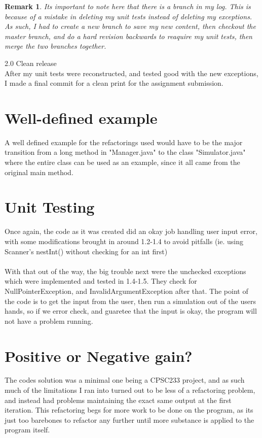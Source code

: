 \documentclass{article}
\newtheorem*{REM}{Remark}
\begin{document}
		\begin{REM}
			Its important to note here that there is a branch in my log. This is because of a mistake in deleting my unit tests
			instead of deleting my exceptions. As such, I had to create a new branch to save my new content, then checkout
			the master branch, and do a hard revision backwards to reaquire my unit tests, then merge the two branches together.
		\end{REM}
		\begin{description}
			\item 2.0 Clean release \hfill \\
				After my unit tests were reconstructed, and tested good with the new exceptions, I made a final commit for a 
				clean print for the assignment submission.
		\end{description}
	\section*{Well-defined example}
		A well defined example for the refactorings used would have to be the major transition from a long method in "Manager.java"
		to the class "Simulator.java" where the entire class can be used as an example, since it all came from the original main method.

	\section*{Unit Testing}
		Once again, the code as it was created did an okay job handling user input error, with some modifications 
		brought in around 1.2-1.4 to avoid pitfalls (ie. using Scanner's nestInt() without checking for an int first) \\ \\
		With that out of the way, the big trouble next were the unchecked exceptions which were implemented 
		and tested in 1.4-1.5. They check for NullPointerException, and InvalidArgumentException after that.
		The point of the code is to get the input from the user, then run a simulation out of the users hands, so if we
		error check, and guaretee that the input is okay, the program will not have a problem running.
	\section*{Positive or Negative gain?}
		The codes solution was a minimal one being a CPSC233 project, and as such much of the limitations I ran
		into turned out to be less of a refactoring problem, and instead had problems maintaining the exact same output
		at the first iteration. This refactoring begs for more work to be done on the program, as its just too barebones 
		to refactor any further until more substance is applied to the program itself.
\end{document}
